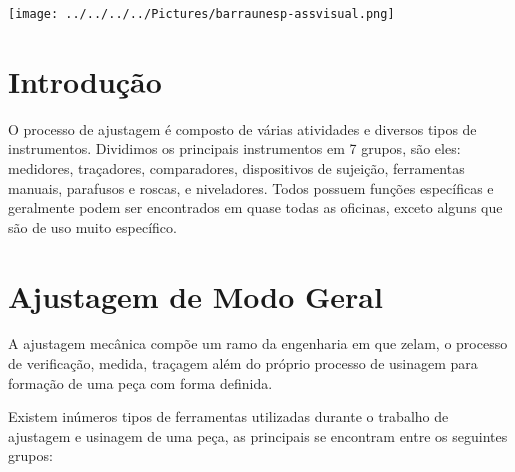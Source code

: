 \documentclass[
	12pt,				%
	oneside,			%
	a4paper,			%
	english,			%
	french,				%
	spanish,			%
	brazil,				%
	]{abntex2}
\begin{document}
\begin{minipage}[c][1.5cm][c]{3cm} %

\texttt{[image: ../../../../Pictures/barraunesp-assvisual.png]}

\end{minipage}


\frenchspacing 


\imprimircapa

\imprimirfolhaderosto*

\tableofcontents*
\newpage

\section[Introdução]{Introdução}
\pagestyle{fancy}

O processo de ajustagem é composto de várias atividades e diversos tipos de instrumentos. Dividimos os principais instrumentos em 7 grupos, são eles: medidores, traçadores, comparadores, dispositivos de sujeição, ferramentas manuais, parafusos e roscas, e niveladores. Todos possuem funções específicas e geralmente podem ser encontrados em quase todas as oficinas, exceto alguns que são de uso muito específico. 

\section[Ajustagem de Modo Geral]{Ajustagem de Modo Geral}

A ajustagem mecânica compõe um ramo da engenharia em que zelam, o processo de verificação, medida, traçagem além do próprio processo de usinagem para formação de uma peça com forma definida.	

Existem inúmeros tipos de ferramentas utilizadas durante o trabalho de ajustagem e usinagem de uma peça, as principais se encontram entre os seguintes grupos: 
\end{document}
